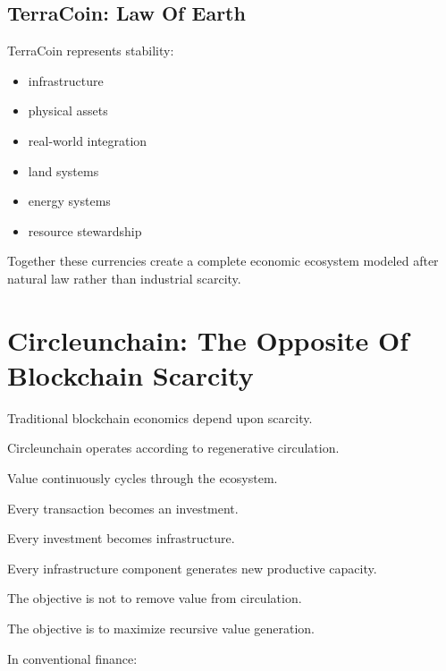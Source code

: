 ﻿\documentclass[12pt]{article}
\begin{document}
\subsection{TerraCoin: Law Of Earth}


TerraCoin represents stability:

\begin{itemize}
  \item infrastructure
\end{itemize}
\begin{itemize}
  \item physical assets
\end{itemize}
\begin{itemize}
  \item real-world integration
\end{itemize}
\begin{itemize}
  \item land systems
\end{itemize}
\begin{itemize}
  \item energy systems
\end{itemize}
\begin{itemize}
  \item resource stewardship
\end{itemize}

Together these currencies create a complete economic ecosystem modeled after natural law rather than industrial scarcity.

\section{Circleunchain: The Opposite Of Blockchain Scarcity}


Traditional blockchain economics depend upon scarcity.

Circleunchain operates according to regenerative circulation.

Value continuously cycles through the ecosystem.

Every transaction becomes an investment.

Every investment becomes infrastructure.

Every infrastructure component generates new productive capacity.

The objective is not to remove value from circulation.

The objective is to maximize recursive value generation.

In conventional finance:
\end{document}
